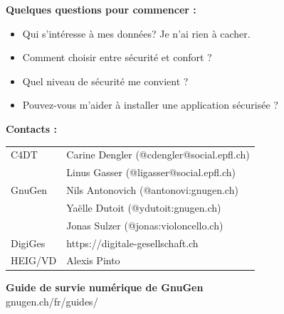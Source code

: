 \documentclass[a0paper,portrait]{baposter}
\begin{document}
\begin{poster}
{  \vspace{1em}

  \textbf{\color{red}Quelques questions pour commencer :}
  \begin{itemize}
  \item Qui s'intéresse à mes données? Je n'ai rien à cacher.
  \item Comment choisir entre sécurité et confort ?
  \item Quel niveau de sécurité me convient ?
  \item Pouvez-vous m'aider à installer une application sécurisée ?
  \end{itemize}

  \vspace{1em}

  \begin{minipage}[t]{0.7\linewidth}
    \textbf{\color{red}Contacts :} \\
    \vspace{2em}
    \small
    \begin{tabular}{ll}
    \\
    C4DT & Carine Dengler (@cdengler@social.epfl.ch) \\
         & Linus Gasser (@ligasser@social.epfl.ch) \\
    GnuGen & Nils Antonovich (@antonovi:gnugen.ch) \\
         & Yaëlle Dutoit (@ydutoit:gnugen.ch) \\
         & Jonas Sulzer (@jonas:violoncello.ch) \\
    DigiGes & https://digitale-gesellschaft.ch \\
    HEIG/VD & Alexis Pinto \\
    \end{tabular}%
  \end{minipage}%
  \begin{minipage}[t]{0.28\linewidth}
    \begin{flushright}
    \small\textbf{Guide de survie numérique de GnuGen} \\
    \vspace{1em}
    \footnotesize{gnugen.ch/fr/guides/}
    \end{flushright}
  \end{minipage}
}

%
%

\newcommand{\qrspace}{\vspace{1em}}
\newcommand{\qrcodeurl}[3][0.75cm]{
    \centering
    \begin{tikzpicture}
        \node(qrcode){\qrcode[height=2.2cm,level=H]{https://#2}};
        \node(overlay){\texttt{[image: assets/apps/\#3.png]}};
    \end{tikzpicture} \\
    \small{#2}
}


\end{poster}
\end{document}
